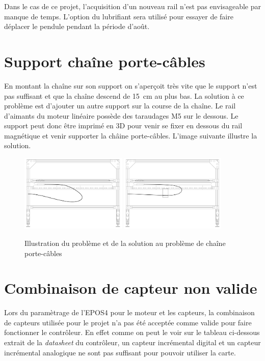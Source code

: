Dans le cas de ce projet, l'acquisition d'un nouveau rail n'est pas envisageable par manque de temps. L'option du lubrifiant sera utilisé pour
essayer de faire déplacer le pendule pendant la période d'août.

\section{Support chaîne porte-câbles}\label{sec:ProbChaine}
En montant la chaîne sur son support on s'aperçoit très vite que le support n'est pas suffisant et que la chaîne descend de 15~cm au plus bas.
La solution à ce problème est d'ajouter un autre support sur la course de la chaîne. Le rail d'aimants du moteur linéaire possède des taraudages
M5 sur le dessous. Le support peut donc être imprimé en 3D pour venir se fixer en dessous du rail magnétique et venir supporter la châine porte-câbles.
L'image suivante illustre la solution.

\begin{figure}[H]
    \centering
    \includegraphics[width = 0.45\textwidth]{assets/figures/ProbChaine.svg}\hfill
    \includegraphics[width = 0.45\textwidth]{assets/figures/SolChaine.svg}
    \caption{Illustration du problème et de la solution au problème de chaîne porte-câbles}
    \label{fig:SolChaine}
\end{figure}

\section{Combinaison de capteur non valide}\label{sec:ProbCapt}
Lors du paramètrage de l'EPOS4 pour le moteur et les capteurs, la combinaison de capteurs utilisée pour le projet n'a pas été acceptée comme
valide pour faire fonctionner le contrôleur. En effet comme on peut le voir sur le tableau ci-dessous extrait de la \textit{datasheet} du contrôleur, un
capteur incrémental digital et un capteur incrémental analogique ne sont pas suffisant pour pouvoir utiliser la carte.

